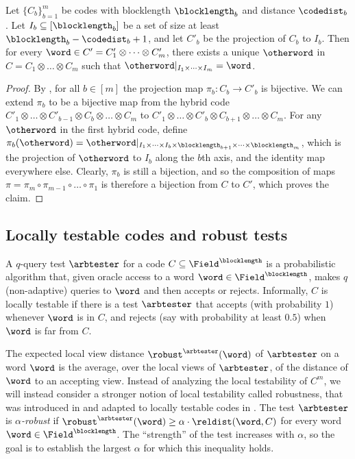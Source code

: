\documentclass{toc}
\theoremstyle{plain}
\begin{document}
\begin{claim}
\label{claim:tensorext}
Let $\{C_b\}_{b = 1}^{m}$ be codes with blocklength $\blocklength_b$ and distance $\codedist_b$. Let $I_b \subseteq [\blocklength_b]$ be a set of size at least $\blocklength_b - \codedist_b + 1$, and let $C'_b$ be the projection of $C_b$ to $I_b$. Then for every $\word \in C' =  C'_1 \otimes \dots \otimes C'_m$, there exists a unique $\otherword$ in $C = C_1 \otimes \dots \otimes C_m$ such that $\otherword \vert_{I_1 \times \dots \times I_m} = \word$.
\end{claim}

\begin{proof}
By , for all $b \in[m]$ the projection map $\pi_b \colon C_b \to C'_b$ is bijective. We can extend $\pi_b$ to be a bijective map from the hybrid code $C'_1 \otimes \dots \otimes C'_{b-1} \otimes C_b \otimes \dots \otimes C_m$ to $C'_1 \otimes \dots \otimes C'_{b} \otimes C_{b+1} \otimes \dots \otimes C_m$. For any $\otherword$ in the first hybrid code, define $\pi_b(\otherword) = \otherword \vert_{I_1 \times \dots \times I_b \times \blocklength_{b+1} \times \dots \times \blocklength_m}$, which is the projection of $\otherword$ to $I_b$ along the $b$th axis, and the identity map everywhere else. Clearly, $\pi_b$ is still a bijection, and so the composition of maps $\pi = \pi_m \circ \pi_{m-1} \circ \dots \circ \pi_1$ is therefore a bijection from $C$ to $C'$, which proves the claim.
\end{proof}



%
%
\subsection{Locally testable codes and robust tests}
\label{sec:ltc}

A $q$-query test $\arbtester$ for a code $C \subseteq \Field^{\blocklength}$ is a probabilistic algorithm that, given oracle access to a word $\word \in \Field^{\blocklength}$, makes $q$ (non-adaptive) queries to $\word$ and then accepts or rejects. Informally, $C$ is locally testable if there is a test $\arbtester$ that accepts (with probability $1$) whenever $\word$ is in $C$, and rejects (say with probability at least $0.5$) when $\word$ is far from $C$.

The expected local view distance $\robust^{\arbtester}(\word)$ of $\arbtester$ on a word $\word$ is the average, over the local views of $\arbtester$, of the distance of $\word$ to an accepting view. Instead of analyzing the local testability of $C^m$, we will instead consider a stronger notion of local testability called robustness, that was introduced in \cite{BenSassonGHSV06} and adapted to locally  testable codes in \cite{Ben-SassonS06}. The test $\arbtester$ is \emph{$\alpha$-robust} if $\robust^{\arbtester}(\word) \geq \alpha \cdot \reldist(\word, C)$ for every word $\word \in \Field^{\blocklength}$. The ``strength'' of the test increases with $\alpha$, so the goal is to establish the largest $\alpha$ for which this inequality holds.
\end{document}
